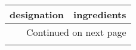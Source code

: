 \begin{longtable}{p{5cm}p{10cm}}
\toprule
                                                                                              designation &                                                                                                                                                                                                                                                                                                                                                                                                                                                                                                                                                                                                                                                                                                                                                                                                                                                                                                                                                                                                                              ingredients \\
\midrule
\endhead
\midrule
\multicolumn{2}{r}{{Continued on next page}} \\
\midrule
\endfoot


\end{longtable}
